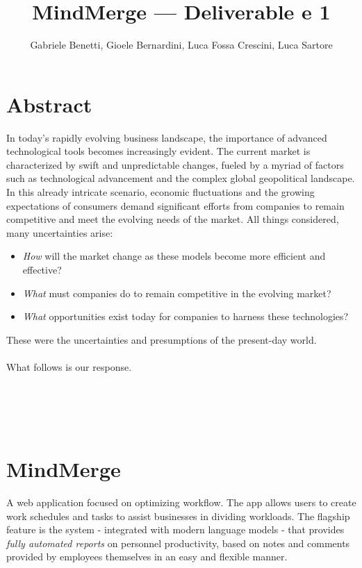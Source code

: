 \documentclass{article}
\title{MindMerge --- Deliverable e 1}
\author{Gabriele Benetti, Gioele Bernardini, Luca Fossa Crescini, Luca Sartore}
\begin{document}
\maketitle


\tableofcontents


\newpage
{}
\section*{Abstract}   %
In today's rapidly evolving business landscape, the importance of advanced technological tools becomes increasingly evident. 
The current market is characterized by swift and unpredictable changes, fueled by a myriad of factors such as technological advancement and the complex global geopolitical landscape. 
In this already intricate scenario, economic fluctuations and the growing expectations of consumers 
demand significant efforts from companies to remain competitive 
and meet the evolving needs of the market. All things considered, many uncertainties arise:

\begin{itemize}
    \item \textit{How} will the market change as these models become more efficient and effective?
    \item \textit{What} must companies do to remain competitive in the evolving market?
    \item \textit{What} opportunities exist today for companies to harness these technologies?
\end{itemize}
These were the uncertainties and presumptions of the present-day world.\\
\\
What follows is our response.
\\
\\
\\
\\
\\

\section*{MindMerge}
A web application focused on optimizing workflow. 
The app allows users to create work schedules and tasks to assist businesses in dividing workloads. 
The flagship feature is the system - integrated with modern language models - that provides \textit{fully automated reports} on personnel productivity, based on notes and comments provided by employees themselves in an easy and flexible manner.
\pagebreak
\restoregeometry
\end{document}
